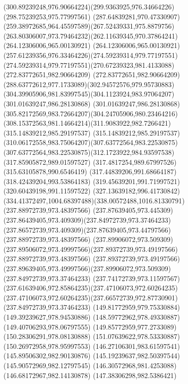 {    \curveto(300.89239248,976.90664224)(299.9363925,976.34664226)(298.75239253,975.77997561)
    \curveto(287.64839281,970.47330907)(259.38972685,964.45597589)(267.52439331,975.8879756)
    \curveto(263.80306007,973.79464232)(262.11639345,970.37864241)(264.12306006,965.00130921)
    \curveto(264.12306006,965.00130921)(257.61239356,976.33464226)(274.59239314,979.77197551)
    \curveto(274.59239314,979.77197551)(270.67239323,981.4133088)(272.83772651,982.90664209)
    \curveto(272.83772651,982.90664209)(288.63772612,977.1733089)(302.94572576,979.95730883)
    \curveto(304.39905906,981.83997545)(304.1123924,983.97064207)(301.01639247,986.28130868)
    \curveto(301.01639247,986.28130868)(305.82172569,983.72664207)(304.24705906,980.23464216)
    \curveto(308.15372563,981.14664214)(311.9083922,982.7266421)(315.14839212,985.29197537)
    \curveto(315.14839212,985.29197537)(310.06172558,983.75064207)(307.63772564,983.22530875)
    \curveto(307.63772564,983.22530875)(312.1723922,984.93597538)(317.85905872,989.01597527)
    \lineto(317.4817254,989.67997526)
    \lineto(315.63105878,990.6546419)
    \lineto(317.44839206,991.68664187)
    \lineto(318.42439204,993.53864183)
    \lineto(319.45639201,991.71997521)
    \lineto(320.60439198,991.11597522)
    \curveto(327.13639182,996.41730842)(334.41372497,1004.68397488)(338.00572488,1016.81330791)
    \moveto(237.88972739,973.48397566)
    \curveto(237.87639405,973.445309)(237.86439405,973.409309)(237.84972739,973.37464233)
    \curveto(237.86572739,973.409309)(237.87639405,973.44797566)(237.88972739,973.48397566)
    \moveto(237.89906072,973.509309)
    \curveto(237.89506072,973.49997566)(237.89372739,973.49197566)(237.88972739,973.48397566)
    \curveto(237.89372739,973.49197566)(237.89639405,973.49997566)(237.89906072,973.509309)
    \moveto(237.84972739,973.37464233)
    \curveto(237.74172739,973.11597567)(237.61639406,972.85864235)(237.47106073,972.60264235)
    \curveto(237.47106073,972.60264235)(237.66572739,972.87730901)(237.84972739,973.37464233)
    \moveto(149.81772959,979.75330884)
    \lineto(149.39239627,978.94530886)
    \lineto(148.59772962,978.49330887)
    \lineto(149.40706293,978.06797555)
    \lineto(149.85772959,977.2733089)
    \lineto(150.28306291,978.08130888)
    \lineto(151.07639622,978.53330887)
    \lineto(150.26972958,978.95997553)
    \closepath
    \moveto(146.27106301,983.61597541)
    \lineto(145.89506302,982.90130876)
    \lineto(145.19239637,982.50397544)
    \lineto(145.90572969,982.12797545)
    \lineto(146.30572968,981.4253088)
    \lineto(146.68172967,982.14130878)
    \lineto(147.38306298,982.5386421)
}
